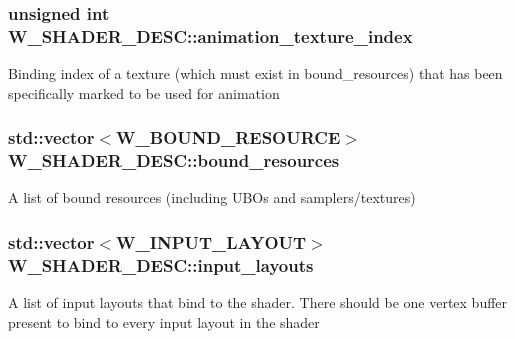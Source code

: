 \subsubsection[{\texorpdfstring{animation\+\_\+texture\+\_\+index}{animation_texture_index}}]{\setlength{\rightskip}{0pt plus 5cm}unsigned int W\+\_\+\+S\+H\+A\+D\+E\+R\+\_\+\+D\+E\+S\+C\+::animation\+\_\+texture\+\_\+index}\hypertarget{struct_w___s_h_a_d_e_r___d_e_s_c_ac1b40ff1facba393210a61aeb5a064ea}{}\label{struct_w___s_h_a_d_e_r___d_e_s_c_ac1b40ff1facba393210a61aeb5a064ea}
Binding index of a texture (which must exist in bound\+\_\+resources) that has been specifically marked to be used for animation 
\subsubsection[{\texorpdfstring{bound\+\_\+resources}{bound_resources}}]{\setlength{\rightskip}{0pt plus 5cm}std\+::vector$<${\bf W\+\_\+\+B\+O\+U\+N\+D\+\_\+\+R\+E\+S\+O\+U\+R\+CE}$>$ W\+\_\+\+S\+H\+A\+D\+E\+R\+\_\+\+D\+E\+S\+C\+::bound\+\_\+resources}\hypertarget{struct_w___s_h_a_d_e_r___d_e_s_c_aa3fea1cc775493c0fe9590129f91df63}{}\label{struct_w___s_h_a_d_e_r___d_e_s_c_aa3fea1cc775493c0fe9590129f91df63}
A list of bound resources (including U\+B\+Os and samplers/textures) 
\subsubsection[{\texorpdfstring{input\+\_\+layouts}{input_layouts}}]{\setlength{\rightskip}{0pt plus 5cm}std\+::vector$<${\bf W\+\_\+\+I\+N\+P\+U\+T\+\_\+\+L\+A\+Y\+O\+UT}$>$ W\+\_\+\+S\+H\+A\+D\+E\+R\+\_\+\+D\+E\+S\+C\+::input\+\_\+layouts}\hypertarget{struct_w___s_h_a_d_e_r___d_e_s_c_a994385c2ccd44ff6b0879ac15ba035cd}{}\label{struct_w___s_h_a_d_e_r___d_e_s_c_a994385c2ccd44ff6b0879ac15ba035cd}
A list of input layouts that bind to the shader. There should be one vertex buffer present to bind to every input layout in the shader 
